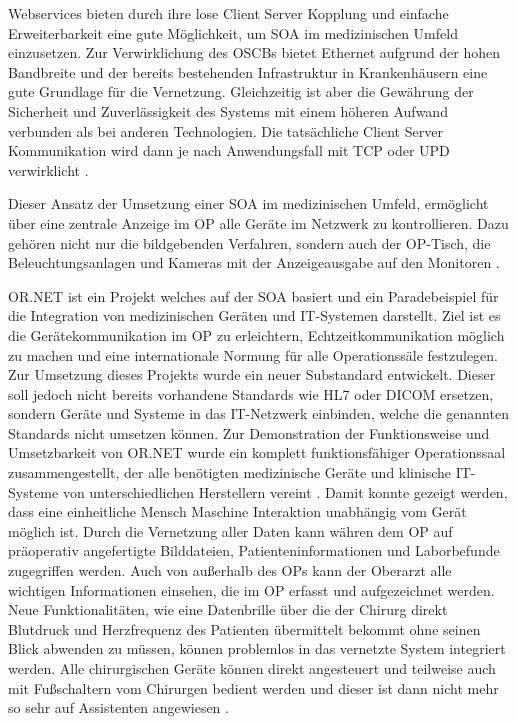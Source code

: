 Webservices bieten durch ihre lose Client Server Kopplung und einfache Erweiterbarkeit eine gute Möglichkeit, um SOA im medizinischen Umfeld einzusetzen. Zur Verwirklichung des OSCBs bietet Ethernet aufgrund der hohen Bandbreite und der bereits bestehenden Infrastruktur in Krankenhäusern eine gute Grundlage für die Vernetzung. Gleichzeitig ist aber die Gewährung der Sicherheit und Zuverlässigkeit des Systems mit einem höheren Aufwand verbunden als bei anderen Technologien.
Die tatsächliche Client Server Kommunikation wird dann je nach Anwendungsfall mit TCP oder UPD verwirklicht \cite{DerDigitaleOperationssaal}.

Dieser Ansatz der Umsetzung einer SOA im medizinischen Umfeld, ermöglicht über eine zentrale Anzeige im OP alle Geräte im Netzwerk zu kontrollieren. Dazu gehören nicht nur die bildgebenden Verfahren, sondern auch der OP-Tisch, die Beleuchtungsanlagen und Kameras mit der Anzeigeausgabe auf den Monitoren \cite{DerDigitaleOperationssaal}.

OR.NET ist ein Projekt welches auf der SOA basiert und ein Paradebeispiel für die Integration von medizinischen Geräten und IT-Systemen darstellt. Ziel  ist es die Gerätekommunikation im OP zu erleichtern, Echtzeitkommunikation möglich zu machen und eine internationale Normung für alle Operationssäle festzulegen. 
Zur Umsetzung dieses Projekts wurde ein neuer Substandard entwickelt. Dieser soll jedoch nicht bereits vorhandene Standards wie HL7 oder DICOM ersetzen, sondern Geräte und Systeme in das IT-Netzwerk einbinden, welche die genannten Standards nicht umsetzen können.
Zur Demonstration der Funktionsweise und Umsetzbarkeit von OR.NET wurde ein komplett funktionsfähiger Operationssaal zusammengestellt, der alle benötigten medizinische Geräte und klinische IT-Systeme von unterschiedlichen Herstellern vereint \cite{ORnet}.
Damit konnte gezeigt werden, dass eine einheitliche Mensch Maschine Interaktion unabhängig vom Gerät möglich ist. Durch die Vernetzung aller Daten kann währen dem OP auf präoperativ angefertigte Bilddateien, Patienteninformationen und Laborbefunde zugegriffen werden. Auch von außerhalb des OPs kann der Oberarzt alle wichtigen Informationen einsehen, die im OP erfasst und aufgezeichnet werden. Neue Funktionalitäten, wie eine Datenbrille über die der Chirurg direkt Blutdruck und Herzfrequenz des Patienten übermittelt bekommt ohne seinen Blick abwenden zu müssen, können problemlos in das vernetzte System integriert werden. Alle chirurgischen Geräte können direkt angesteuert und teilweise auch mit Fußschaltern vom Chirurgen bedient werden und dieser ist dann nicht mehr so sehr auf Assistenten angewiesen \cite{ORnetWebsite}.

